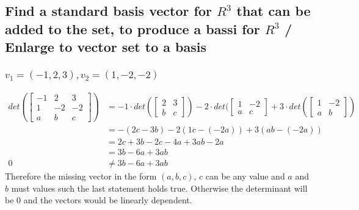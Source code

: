\documentclass[12pt, a4paper]{article}
\begin{document}
		\subsection{Find a standard basis vector for $R^3$ that can be added to the set, to produce a bassi for $R^3$ / Enlarge to vector set to a basis}
			\subsubsection{$v_1=(-1,2,3),v_2=(1,-2,-2)$}
				\begin{align*}
					det(\begin{bmatrix} -1&2&3\\1&-2&-2\\a&b&c\end{bmatrix})&=-1\cdot det(\begin{bmatrix}2&3\\b&c\end{bmatrix})-2\cdot det(\begin{bmatrix}1&-2\\a&c\end{bmatrix}+3\cdot det(\begin{bmatrix}1&-2\\a&b\end{bmatrix})\\
					&=-(2c-3b)-2(1c-(-2a))+3(ab-(-2a))\\
					&=2c+3b-2c-4a+3ab-2a\\
					&=3b-6a+3ab\\
					0&\neq 3b-6a+3ab
				\end{align*}
				Therefore the missing vector in the form $(a,b,c)$, $c$ can be any value and $a$ and $b$ must values such the last statement holds true. Otherwise the determinant will be 0 and the vectors would be linearly dependent.
\end{document}
